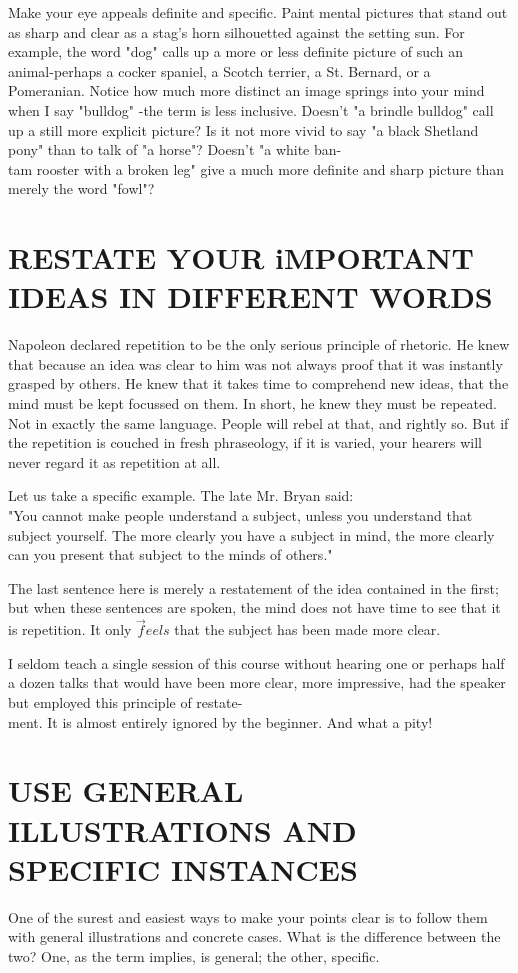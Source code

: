 \documentclass[10pt]{article}
\begin{document}
Make your eye appeals definite and specific. Paint mental pictures that stand out as sharp and clear as a stag's horn silhouetted against the setting sun. For example, the word "dog" calls up a more or less definite picture of such an animal-perhaps a cocker spaniel, a Scotch terrier, a St. Bernard, or a Pomeranian. Notice how much more distinct an image springs into your mind when I say "bulldog" -the term is less inclusive. Doesn't "a brindle bulldog" call up a still more explicit picture? Is it not more vivid to say "a black Shetland pony" than to talk of "a horse"? Doesn't "a white ban-\\
tam rooster with a broken leg" give a much more definite and sharp picture than merely the word "fowl"?

\section*{RESTATE YOUR iMPORTANT IDEAS IN DIFFERENT WORDS}
Napoleon declared repetition to be the only serious principle of rhetoric. He knew that because an idea was clear to him was not always proof that it was instantly grasped by others. He knew that it takes time to comprehend new ideas, that the mind must be kept focussed on them. In short, he knew they must be repeated. Not in exactly the same language. People will rebel at that, and rightly so. But if the repetition is couched in fresh phraseology, if it is varied, your hearers will never regard it as repetition at all.

Let us take a specific example. The late Mr. Bryan said:\\
"You cannot make people understand a subject, unless you understand that subject yourself. The more clearly you have a subject in mind, the more clearly can you present that subject to the minds of others."

The last sentence here is merely a restatement of the idea contained in the first; but when these sentences are spoken, the mind does not have time to see that it is repetition. It only $\vec{f} e e l s$ that the subject has been made more clear.

I seldom teach a single session of this course without hearing one or perhaps half a dozen talks that would have been more clear, more impressive, had the speaker but employed this principle of restate-\\
ment. It is almost entirely ignored by the beginner. And what a pity!

\section*{USE GENERAL ILLUSTRATIONS AND SPECIFIC INSTANCES}
One of the surest and easiest ways to make your points clear is to follow them with general illustrations and concrete cases. What is the difference between the two? One, as the term implies, is general; the other, specific.
\end{document}
